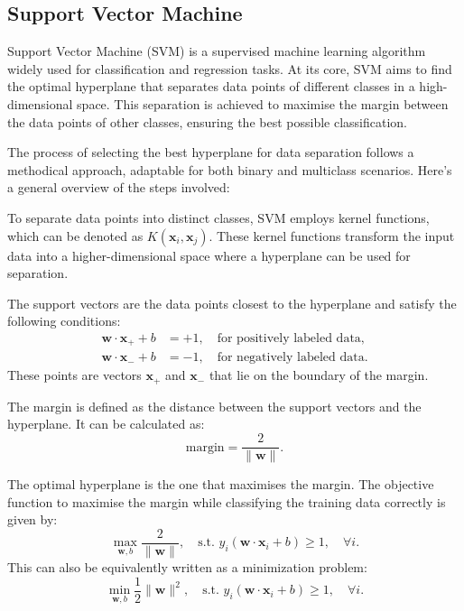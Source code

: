 \subsection*{Support Vector Machine}

Support Vector Machine (SVM) is a supervised machine learning algorithm widely used for classification and regression tasks. At its core, SVM aims to find the optimal hyperplane that separates data points of different classes in a high-dimensional space. This separation is achieved to maximise the margin between the data points of other classes, ensuring the best possible classification.


The process of selecting the best hyperplane for data separation follows a methodical approach, adaptable for both binary and multiclass scenarios. Here's a general overview of the steps involved:

To separate data points into distinct classes, SVM employs kernel functions, which can be denoted as \( K(\mathbf{x}_i, \mathbf{x}_j) \). These kernel functions transform the input data into a higher-dimensional space where a hyperplane can be used for separation.

The support vectors are the data points closest to the hyperplane and satisfy the following conditions:
\begin{align}
    \mathbf{w} \cdot \mathbf{x}_+ + b &= +1, \quad \text{for positively labeled data,} \\
    \mathbf{w} \cdot \mathbf{x}_- + b &= -1, \quad \text{for negatively labeled data.}
\end{align}
These points are vectors \(\mathbf{x}_+\) and \(\mathbf{x}_-\) that lie on the boundary of the margin.

The margin is defined as the distance between the support vectors and the hyperplane. It can be calculated as:
\begin{equation}
    \text{margin} = \frac{2}{\|\mathbf{w}\|}.
\end{equation}

The optimal hyperplane is the one that maximises the margin. The objective function to maximise the margin while classifying the training data correctly is given by:
\begin{equation}
    \max_{\mathbf{w}, b} \frac{2}{\|\mathbf{w}\|}, \quad \text{s.t. } y_i(\mathbf{w} \cdot \mathbf{x}_i + b) \geq 1, \quad \forall i.
\end{equation}
This can also be equivalently written as a minimization problem:
\begin{equation}
    \min_{\mathbf{w}, b} \frac{1}{2} \|\mathbf{w}\|^2, \quad \text{s.t. } y_i(\mathbf{w} \cdot \mathbf{x}_i + b) \geq 1, \quad \forall i.
\end{equation}

